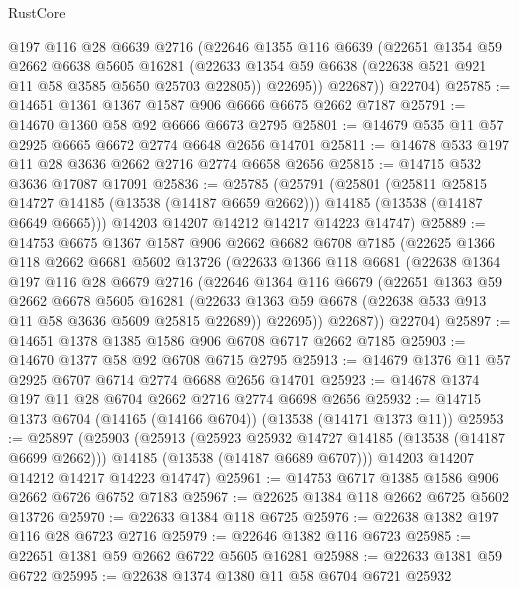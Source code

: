 \begin{lexlean}{RustCore}
\begin{coremodule}
          @197
          @116
          @28
          @6639
          @2716
          (@22646
            @1355
            @116
            @6639
            (@22651
              @1354
              @59
              @2662
              @6638
              @5605
              @16281
              (@22633 @1354 @59 @6638 (@22638 @521 @921 @11 @58 @3585 @5650 @25703 @22805))
              @22695))
          @22687))
      @22704)
@25785 := @14651 @1361 @1367 @1587 @906 @6666 @6675 @2662 @7187
@25791 := @14670 @1360 @58 @92 @6666 @6673 @2795
@25801 := @14679 @535 @11 @57 @2925 @6665 @6672 @2774 @6648 @2656 @14701
@25811 := @14678 @533 @197 @11 @28 @3636 @2662 @2716 @2774 @6658 @2656
@25815 := @14715 @532 @3636 @17087 @17091
@25836 := @25785
    (@25791
      (@25801
        (@25811 @25815 @14727 @14185 (@13538 (@14187 @6659 @2662)))
        @14185
        (@13538 (@14187 @6649 @6665)))
      @14203
      @14207
      @14212
      @14217
      @14223
      @14747)
@25889 := @14753
    @6675
    @1367
    @1587
    @906
    @2662
    @6682
    @6708
    @7185
    (@22625
      @1366
      @118
      @2662
      @6681
      @5602
      @13726
      (@22633
        @1366
        @118
        @6681
        (@22638
          @1364
          @197
          @116
          @28
          @6679
          @2716
          (@22646
            @1364
            @116
            @6679
            (@22651
              @1363
              @59
              @2662
              @6678
              @5605
              @16281
              (@22633 @1363 @59 @6678 (@22638 @533 @913 @11 @58 @3636 @5609 @25815 @22689))
              @22695))
          @22687))
      @22704)
@25897 := @14651 @1378 @1385 @1586 @906 @6708 @6717 @2662 @7185
@25903 := @14670 @1377 @58 @92 @6708 @6715 @2795
@25913 := @14679 @1376 @11 @57 @2925 @6707 @6714 @2774 @6688 @2656 @14701
@25923 := @14678 @1374 @197 @11 @28 @6704 @2662 @2716 @2774 @6698 @2656
@25932 := @14715 @1373 @6704 (@14165 (@14166 @6704)) (@13538 (@14171 @1373 @11))
@25953 := @25897
    (@25903
      (@25913
        (@25923 @25932 @14727 @14185 (@13538 (@14187 @6699 @2662)))
        @14185
        (@13538 (@14187 @6689 @6707)))
      @14203
      @14207
      @14212
      @14217
      @14223
      @14747)
@25961 := @14753 @6717 @1385 @1586 @906 @2662 @6726 @6752 @7183
@25967 := @22625 @1384 @118 @2662 @6725 @5602 @13726
@25970 := @22633 @1384 @118 @6725
@25976 := @22638 @1382 @197 @116 @28 @6723 @2716
@25979 := @22646 @1382 @116 @6723
@25985 := @22651 @1381 @59 @2662 @6722 @5605 @16281
@25988 := @22633 @1381 @59 @6722
@25995 := @22638 @1374 @1380 @11 @58 @6704 @6721 @25932

\end{coremodule}
\end{lexlean}
